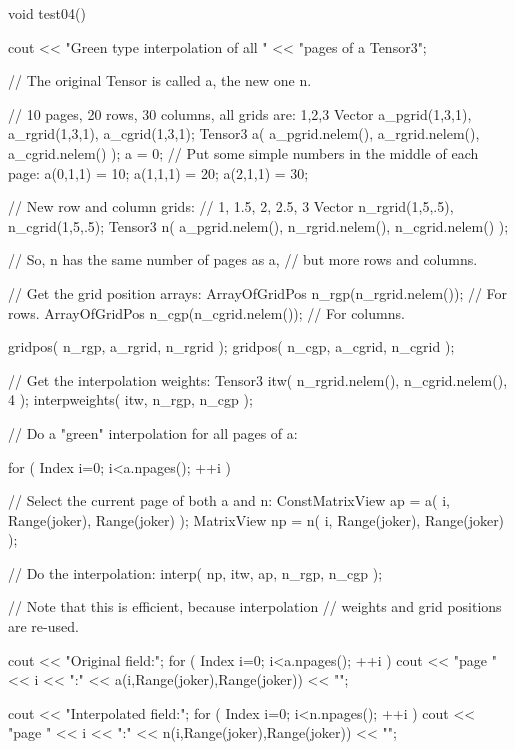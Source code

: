 \begin{code}
void test04()
{
  cout << "Green type interpolation of all "
       << "pages of a Tensor3\n";

  // The original Tensor is called a, the new one n. 

  // 10 pages, 20 rows, 30 columns, all grids are: 1,2,3
  Vector  a_pgrid(1,3,1), a_rgrid(1,3,1), a_cgrid(1,3,1); 
  Tensor3 a( a_pgrid.nelem(),
             a_rgrid.nelem(),
             a_cgrid.nelem() ); 
  a = 0;
  // Put some simple numbers in the middle of each page:
  a(0,1,1) = 10;
  a(1,1,1) = 20;
  a(2,1,1) = 30;

  // New row and column grids:
  // 1, 1.5, 2, 2.5, 3
  Vector  n_rgrid(1,5,.5), n_cgrid(1,5,.5); 
  Tensor3 n( a_pgrid.nelem(),
             n_rgrid.nelem(),
             n_cgrid.nelem() ); 

  // So, n has the same number of pages as a, 
  // but more rows and columns.

  // Get the grid position arrays:
  ArrayOfGridPos n_rgp(n_rgrid.nelem()); // For rows.
  ArrayOfGridPos n_cgp(n_cgrid.nelem()); // For columns.

  gridpos( n_rgp, a_rgrid, n_rgrid );
  gridpos( n_cgp, a_cgrid, n_cgrid );

  // Get the interpolation weights:
  Tensor3 itw( n_rgrid.nelem(), n_cgrid.nelem(), 4 );
  interpweights( itw, n_rgp, n_cgp );

  // Do a "green" interpolation for all pages of a:

  for ( Index i=0; i<a.npages(); ++i )
    {
      // Select the current page of both a and n:
      ConstMatrixView ap = a( i,
                              Range(joker), Range(joker) );
      MatrixView      np = n( i,
                              Range(joker), Range(joker) );

      // Do the interpolation:
      interp( np, itw, ap, n_rgp, n_cgp );

      // Note that this is efficient, because interpolation
      // weights and grid positions are re-used.
    }

  cout << "Original field:\n";
  for ( Index i=0; i<a.npages(); ++i )
      cout << "page " << i << ":\n"
           << a(i,Range(joker),Range(joker)) << "\n";

  cout << "Interpolated field:\n";
  for ( Index i=0; i<n.npages(); ++i )
      cout << "page " << i << ":\n"
           << n(i,Range(joker),Range(joker)) << "\n";
}
\end{code}


